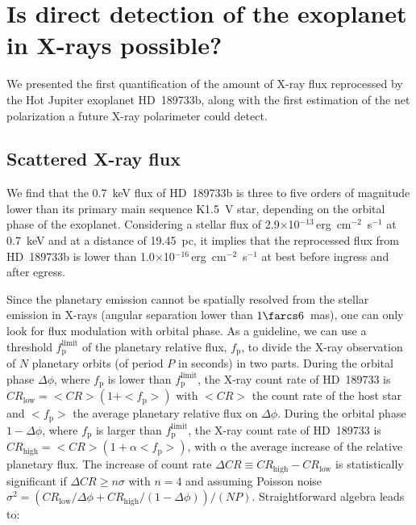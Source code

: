\documentclass[iop]{emulateapj}
\begin{document}
 
\section{Is direct detection of the exoplanet in X-rays possible?}
\label{Discussion}

We presented the first quantification of the amount of X-ray flux reprocessed by the Hot Jupiter exoplanet HD~189733b, along with the first 
estimation of the net polarization a future X-ray polarimeter could detect. 

\subsection{Scattered X-ray flux}

We find that the 0.7~keV flux of HD~189733b is three to five orders of magnitude lower than its primary main sequence K1.5~V star, depending on the 
orbital phase of the exoplanet. Considering a stellar flux of 2.9$\times$10$^{-13~}$erg~cm$^{-2}$~s$^{-1}$ at 0.7~keV and at a distance of 19.45~pc, it 
implies that the reprocessed flux from HD~189733b is lower than 1.0$\times$10$^{-16~}$erg~cm$^{-2}$~s$^{-1}$ at best before ingress and after egress. 

Since the planetary emission cannot be spatially resolved from the stellar emission in X-rays (angular separation lower than $1\farcs6$~mas), one 
can only look for flux modulation with orbital phase. As a guideline, we can use a threshold $f^\mathrm{limit}_\mathrm{p}$ of the planetary relative 
flux, $f_\mathrm{p}$, to divide the X-ray observation of $N$ planetary orbits (of period $P$ in seconds) in two parts. During the orbital phase 
$\Delta\phi$, where $f_\mathrm{p}$ is lower than $f^\mathrm{limit}_\mathrm{p}$, the X-ray count rate of HD~189733 is 
$CR_\mathrm{low}=<\!CR\!>(1+<\!f_\mathrm{p}\!>)$ with $<\!CR\!>$ the count rate of the host star and $<\!f_\mathrm{p}\!>$ the average planetary 
relative flux on $\Delta\phi$. During the orbital phase $1-\Delta\phi$, where $f_\mathrm{p}$ is larger than $f^\mathrm{limit}_\mathrm{p}$, the 
X-ray count rate of HD~189733 is $CR_\mathrm{high}=<\!CR\!>(1+\alpha <\!f_\mathrm{p}\!>)$, with $\alpha$ the average increase of the relative 
planetary flux. The increase of count rate $\Delta CR \equiv CR_\mathrm{high}-CR_\mathrm{low}$ is statistically significant if $\Delta CR \ge n \sigma$ 
with $n=4$ and assuming Poisson noise $\sigma^2=(CR_\mathrm{low}/\Delta\phi+CR_\mathrm{high}/(1-\Delta\phi))/(NP)$. Straightforward algebra leads to: 
\end{document}
